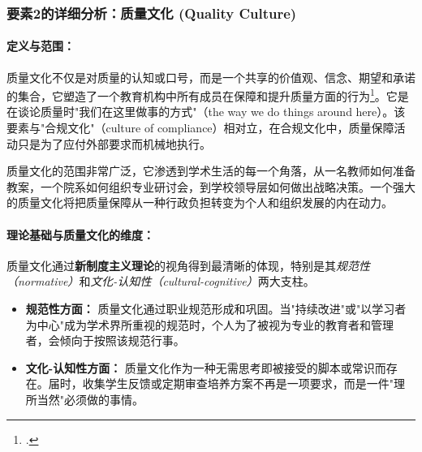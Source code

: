 


\subsubsection{要素2的详细分析：质量文化 (Quality Culture)}
\label{subsubsec:thanh_to_2}

\paragraph{定义与范围：}
质量文化不仅是对质量的认知或口号，而是一个共享的价值观、信念、期望和承诺的集合，它塑造了一个教育机构中所有成员在保障和提升质量方面的行为\footcite{HarveyStensaker}。它是在谈论质量时"我们在这里做事的方式"（the way we do things around here）。该要素与"合规文化"（culture of compliance）相对立，在合规文化中，质量保障活动只是为了应付外部要求而机械地执行。

质量文化的范围非常广泛，它渗透到学术生活的每一个角落，从一名教师如何准备教案，一个院系如何组织专业研讨会，到学校领导层如何做出战略决策。一个强大的质量文化将把质量保障从一种行政负担转变为个人和组织发展的内在动力。

\paragraph{理论基础与质量文化的维度：}
质量文化通过\textbf{新制度主义理论}的视角得到最清晰的体现，特别是其\textit{规范性（normative）}和\textit{文化-认知性（cultural-cognitive）}两大支柱。
\begin{itemize}
    \item \textbf{规范性方面：} 质量文化通过职业规范形成和巩固。当"持续改进"或"以学习者为中心"成为学术界所重视的规范时，个人为了被视为专业的教育者和管理者，会倾向于按照该规范行事。
    \item \textbf{文化-认知性方面：} 质量文化作为一种无需思考即被接受的脚本或常识而存在。届时，收集学生反馈或定期审查培养方案不再是一项要求，而是一件"理所当然"必须做的事情。
\end{itemize}


